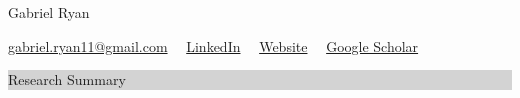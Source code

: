 \documentclass{article} %
\newcommand{\rsection}[1]{
  \hspace{-0.4cm}\vspace{0.1cm}
\colorbox{lightgrey}{
\begin{minipage}{1.07\linewidth}
\vspace{0.22cm}
\fontsize{14pt}{16pt}\selectfont #1
\vspace{0.12cm}
\end{minipage}
}
\par\nopagebreak %
}
\begin{document}
\hspace*{-0.45cm}
{\fontsize{22pt}{22pt}\selectfont Gabriel Ryan}\\
\begin{minipage}{\linewidth}
\vspace{0.1cm}
  {\fontsize{11}{13}\selectfont
      \href{mailto:gabriel.ryan11@gmail.com}{gabriel.ryan11@gmail.com} \ \textbar\ \href{https://linkedin.com/in/gabrielryan1}{LinkedIn} \ \textbar\ \href{https://gryan11.github.io}{Website} \ \textbar\ \href{https://scholar.google.com/citations?user=6mW4eCcAAAAJ\&hl=en}{Google Scholar}
  }
\end{minipage}
\vspace{-0.15cm}

\rsection{Research Summary}
\end{document}
